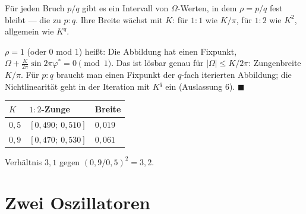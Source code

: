 \begin{merksatz}
Für jeden Bruch $p/q$ gibt es ein Intervall von $\Omega$-Werten, in dem $\rho = p/q$ fest bleibt --- die  zu $p\!:\!q$. Ihre Breite wächst mit $K$: für $1\!:\!1$ wie $K/\pi$, für $1\!:\!2$ wie $K^{2}$, allgemein wie $K^{q}$.

$\rho = 1$ (oder $0$ mod $1$) heißt: Die Abbildung hat einen Fixpunkt, $\Omega + \frac{K}{2\pi}\sin2\pi\varphi^{*} = 0 \pmod 1$. Das ist lösbar genau für $|\Omega| \le K/2\pi$: Zungenbreite $K/\pi$. Für $p\!:\!q$ braucht man einen Fixpunkt der $q$-fach iterierten Abbildung; die Nichtlinearität geht in der Iteration mit $K^{q}$ ein (Auslassung 6). $\blacksquare$

\begin{center}
{\small
\renewcommand{\arraystretch}{1.46}
\begin{tabular}{@{}P{1.2cm}P{2.6cm}P{2.6cm}@{}}
\toprule
$K$ & $1\!:\!2$-Zunge & \textbf{Breite}\\
\midrule
$0{,}5$ & $[0{,}490;\ 0{,}510]$ & $0{,}019$\\
$0{,}9$ & $[0{,}470;\ 0{,}530]$ & $0{,}061$\\
\bottomrule
\end{tabular}}
\end{center}
Verhältnis $3{,}1$ gegen $(0{,}9/0{,}5)^{2} = 3{,}2$. \checkmark

\begin{center}
\begin{minipage}{0.88\textwidth}
\end{minipage}
\end{center}
\end{merksatz}

\section{Zwei Oszillatoren}

